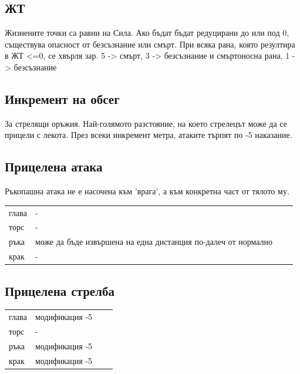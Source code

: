 \subsection{ЖТ}
Жизнените точки са равни на Сила.
Ако бъдат бъдат редуцирани до или под 0, съществува опасност от безсъзнание или смърт.
При всяка рана, която резултира в ЖТ <=0, се хвърля зар.
5 -> смърт, 3 -> безсъзнание и смъртоносна рана, 1 -> безсъзнание






\subsection{Инкремент на обсег}
За стрелящи оръжия.
Най-голямото разстояние, на което стрелецът може да се прицели с лекота.
През всеки инкремент метра, атаките търпят по -5 наказание.


\subsection{Прицелена атака}
Ръкопашна атака не е насочена към 'врага', а към конкретна част от тялото му.
\\
\begin{tabular}{l | l | l | l }
глава & -  \\
торс  & -  \\
ръка  & може да бъде извършена на една дистанция по-далеч от нормално  \\
крак  & -  \\
\end{tabular}


\subsection{Прицелена стрелба}
\begin{tabular}{l | l | l | l }
глава & модификация -5  \\
торс  & -  \\
ръка & модификация -5  \\
крак & модификация -5  \\
\end{tabular}


